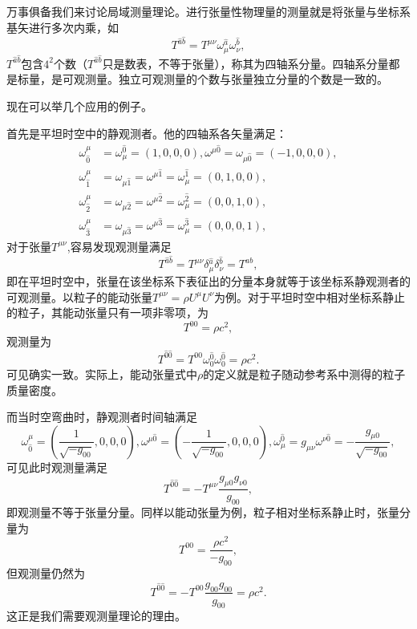 \documentclass[11pt, a4paper, oneside, onecolumn]{ctexart}
\numberwithin{equation}{subsection}
\begin{document}
万事俱备我们来讨论局域测量理论。进行张量性物理量的测量就是将张量与坐标系基矢进行多次内乘，如
\begin{equation}
T^{\hat{a}\hat{b}}=T^{\mu\nu}\omega_{\mu}^{\hat{a}}\omega_{\nu}^{\hat{b}},
\end{equation}
$T^{\hat{a}\hat{b}}$包含$4^{2}$个数（$T^{\hat{a}\hat{b}}$只是数表，不等于张量），称其为四轴系分量。四轴系分量都是标量，是可观测量。独立可观测量的个数与张量独立分量的个数是一致的。

现在可以举几个应用的例子。

首先是平坦时空中的静观测者。他的四轴系各矢量满足：
\begin{align}
\omega_{\hat{0}}^{\mu}&=\omega_{\mu}^{\hat{0}}=\left(1,0,0,0\right),\omega^{\mu\hat{0}}=\omega_{\mu\hat{0}}=\left(-1,0,0,0\right),\label{2.3.22}\\
\omega_{\hat{1}}^{\mu}&=\omega_{\mu\hat{1}}=\omega^{\mu\hat{1}}=\omega_{\mu}^{\hat{1}}=\left(0,1,0,0\right),\\
\omega_{\hat{2}}^{\mu}&=\omega_{\mu\hat{2}}=\omega^{\mu\hat{2}}=\omega_{\mu}^{\hat{2}}=\left(0,0,1,0\right),\\
\omega_{\hat{3}}^{\mu}&=\omega_{\mu\hat{3}}=\omega^{\mu\hat{3}}=\omega_{\mu}^{\hat{3}}=\left(0,0,0,1\right),\label{2.3.25}
\end{align}
对于张量$T^{\mu\nu}$,容易发现观测量满足
\begin{equation}
T^{\hat{a}\hat{b}}=T^{\mu\nu}\delta{}^{\hat{a}}_{\mu}\delta{}^{\hat{b}}_{\nu}=T^{ab},
\end{equation}
即在平坦时空中，张量在该坐标系下表征出的分量本身就等于该坐标系静观测者的可观测量。以粒子的能动张量$T^{\mu\nu}=\rho U^{\mu}U^{\nu}$为例。对于平坦时空中相对坐标系静止的粒子，其能动张量只有一项非零项，为
\begin{equation}
T^{00}=\rho c^{2},
\end{equation}
观测量为
\begin{equation}
T^{\hat{0}\hat{0}}=T^{00}\omega_{0}^{\hat{0}}\omega_{0}^{\hat{0}}=\rho c^{2}.
\end{equation}
可见确实一致。实际上，能动张量式中$\rho$的定义就是粒子随动参考系中测得的粒子质量密度。

而当时空弯曲时，静观测者时间轴满足
\begin{equation}
\omega^{\mu}_{\hat{0}}=\left(\frac{1}{\sqrt{-g_{00}}},0,0,0\right),\omega^{\mu\hat{0}}=\left(-\frac{1}{\sqrt{-g_{00}}},0,0,0\right),\omega_{\mu}^{\hat{0}}=g_{\mu\nu}\omega^{\nu\hat{0}}=-\frac{g_{\mu0}}{\sqrt{-g_{00}}},
\end{equation}
可见此时观测量满足
\begin{equation}
T^{\hat{0}\hat{0}}=-T^{\mu\nu}\frac{g_{\mu0}g_{\nu0}}{g_{00}},
\end{equation}
即观测量不等于张量分量。同样以能动张量为例，粒子相对坐标系静止时，张量分量为
\begin{equation}
T^{00}=\frac{\rho c^{2}}{-g_{00}},
\end{equation}
但观测量仍然为
\begin{equation}
T^{\hat{0}\hat{0}}=-T^{00}\frac{g_{00}g_{00}}{g_{00}}=\rho c^{2}.
\end{equation}
这正是我们需要观测量理论的理由。
\end{document}
